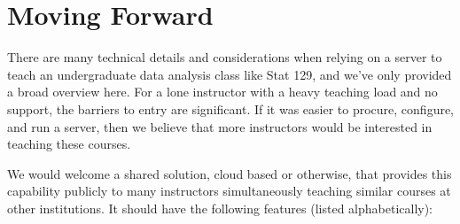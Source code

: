 \documentclass[12pt]{article}
\begin{document}
\section{Moving Forward}

There are many technical details and considerations when relying on a server to teach an undergraduate data analysis class like Stat 129, and we've only provided a broad overview here.
For a lone instructor with a heavy teaching load and no support, the barriers to entry are significant.
If it was easier to procure, configure, and run a server, then we believe that more instructors would be interested in teaching these courses.

We would welcome a shared solution, cloud based or otherwise, that provides this capability publicly to many instructors simultaneously teaching similar courses at other institutions.
It should have the following features (listed alphabetically):
\end{document}
